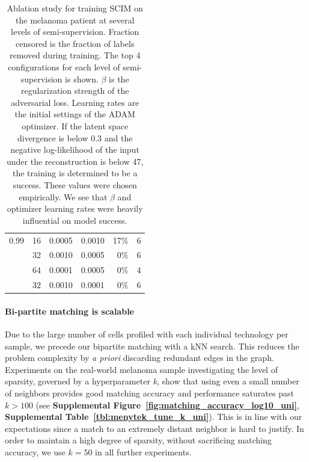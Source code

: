 \begin{table}[h]
\begin{tabular}{rrrrrr}
0.99 &      16 &            0.0005 &  0.0010 &         17\% &           6 \\
     &      32 &            0.0010 &  0.0005 &          0\% &           6 \\
     &      64 &            0.0001 &  0.0005 &          0\% &           4 \\
     &      32 &            0.0010 &  0.0001 &          0\% &           6 \\
\bottomrule
\end{tabular}
\caption{
    Ablation study for training SCIM on the melanoma patient at several levels of semi-supervision.
    Fraction censored is the fraction of labels removed during training.
    The top 4 configurations for each level of semi-supervision is shown.
    $\beta$ is the regularization strength of the adversarial loss.
    Learning rates are the initial settings of the ADAM optimizer.
    If the latent space divergence is below 0.3 and
    the negative log-likelihood of the input under the reconstruction is below 47,
    the training is determined to be a success. These values were chosen empirically.
    We see that $\beta$ and optimizer learning rates were heavily influential on model success.
}
\label{tbl:ablation_menytek}
\end{table}

\paragraph{Bi-partite matching is scalable}
Due to the large number of cells profiled with each individual technology per sample, we precede our bipartite matching with a kNN search.
This reduces the problem complexity by \textit{a priori} discarding redundant edges in the graph.
Experiments on the real-world melanoma sample investigating the level of sparsity, governed by a hyperparameter \textit{k}, show that using even a small number of neighbors provides good matching accuracy and performance saturates past $k>100$ (see \textbf{Supplemental Figure~\ref{fig:matching_accuracy_log10_uni}}, \textbf{Supplemental Table~\ref{tbl:menytek_tune_k_uni}}).
This is in line with our expectations since a match to an extremely distant neighbor is hard to justify.
In order to maintain a high degree of sparsity, without sacrificing matching accuracy, we use $k=50$ in all further experiments.

